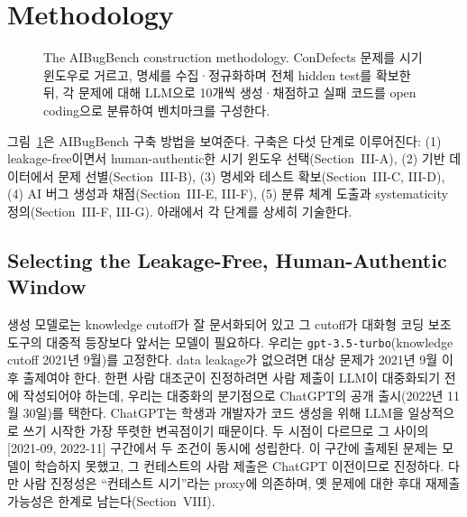 \documentclass[10pt,conference]{IEEEtran}
\begin{document}
\section{Methodology}
\begin{figure}[t]
\centering
{}
\caption{The AIBugBench construction methodology. ConDefects 문제를 시기 윈도우로 거르고, 명세를 수집·정규화하며 전체 hidden test를 확보한 뒤, 각 문제에 대해 LLM으로 10개씩 생성·채점하고 실패 코드를 open coding으로 분류하여 벤치마크를 구성한다.}
\label{fig:pipeline}
\end{figure}
그림~\ref{fig:pipeline}은 AIBugBench 구축 방법을 보여준다. 구축은 다섯 단계로 이루어진다: (1) leakage-free이면서 human-authentic한 시기 윈도우 선택(Section~III-A), (2) 기반 데이터에서 문제 선별(Section~III-B), (3) 명세와 테스트 확보(Section~III-C, III-D), (4) AI 버그 생성과 채점(Section~III-E, III-F), (5) 분류 체계 도출과 systematicity 정의(Section~III-F, III-G). 아래에서 각 단계를 상세히 기술한다.

\subsection{Selecting the Leakage-Free, Human-Authentic Window}
생성 모델로는 knowledge cutoff가 잘 문서화되어 있고 그 cutoff가 대화형 코딩 보조 도구의 대중적 등장보다 앞서는 모델이 필요하다. 우리는 \texttt{gpt-3.5-turbo}(knowledge cutoff 2021년 9월)를 고정한다. data leakage가 없으려면 대상 문제가 2021년 9월 이후 출제여야 한다. 한편 사람 대조군이 진정하려면 사람 제출이 LLM이 대중화되기 전에 작성되어야 하는데, 우리는 대중화의 분기점으로 ChatGPT의 공개 출시(2022년 11월 30일)를 택한다. ChatGPT는 학생과 개발자가 코드 생성을 위해 LLM을 일상적으로 쓰기 시작한 가장 뚜렷한 변곡점이기 때문이다. 두 시점이 다르므로 그 사이의 [2021-09, 2022-11] 구간에서 두 조건이 동시에 성립한다. 이 구간에 출제된 문제는 모델이 학습하지 못했고, 그 컨테스트의 사람 제출은 ChatGPT 이전이므로 진정하다. 다만 사람 진정성은 ``컨테스트 시기''라는 proxy에 의존하며, 옛 문제에 대한 후대 재제출 가능성은 한계로 남는다(Section~VIII).
\end{document}
